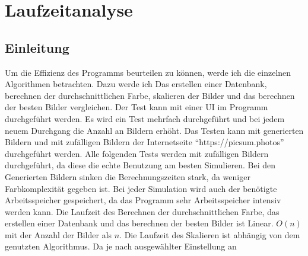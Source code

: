 \section{Laufzeitanalyse}
\subsection{Einleitung}
Um die Effizienz des Programms beurteilen zu können, werde ich die einzelnen Algorithmen betrachten. Dazu werde ich Das erstellen einer Datenbank, berechnen der durchschnittlichen Farbe, skalieren der Bilder und das berechnen der besten Bilder vergleichen. Der Test kann mit einer UI im Programm durchgeführt werden. Es wird ein Test mehrfach durchgeführt und bei jedem neuem Durchgang die Anzahl an Bildern erhöht. Das Testen kann mit generierten Bildern und mit zufälligen Bildern der Internetseite ``https://picsum.photos'' durchgeführt werden. Alle folgenden Tests werden mit zufälligen Bildern durchgeführt, da diese die echte Benutzung am besten Simulieren. Bei den Generierten Bildern sinken die Berechnungszeiten stark, da weniger Farbkomplexität gegeben ist. Bei jeder Simulation wird auch der benötigte Arbeitsspeicher gespeichert, da das Programm sehr Arbeitsspeicher intensiv werden kann. Die Laufzeit des Berechnen der durchschnittlichen Farbe, das erstellen einer Datenbank und das berechnen der besten Bilder ist Linear. $O(n)$ mit der Anzahl der Bilder als $n$. Die Laufzeit des Skalieren ist abhängig von dem genutzten Algorithmus. Da je nach ausgewählter Einstellung an
